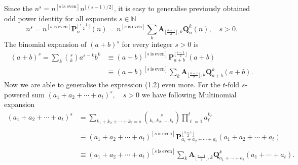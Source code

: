 \documentclass[12pt, letterpaper]{amsart}
\theoremstyle{definition}
\theoremstyle{remark}
\numberwithin{equation}{section}
\begin{document}
Since the $n^s = n^{[s \ \mathrm{is} \ \mathrm{even}]} n^{\lfloor (s-1)/2 \rfloor}$, it is easy to generalise previously obtained odd power identity for all exponents $s\in\mathbb{N}$
\begin{equation}
n^s
= n^{[s \ \mathrm{is} \ \mathrm{even}]} \mathbf{P}^{\lfloor \tfrac{s-1}{2} \rfloor}_{n}(n)
= n^{[s \ \mathrm{is} \ \mathrm{even}]}\sum_{k}^{ \ }\mathbf{A}_{\lfloor \tfrac{s-1}{2} \rfloor, k}\mathbf{Q}^{k}_{n}(n), \quad s>0.
\end{equation}
The binomial expansion of $(a+b)^s$ for every integer $s>0$ is
\begin{equation*}
\begin{split}
(a+b)^s=\sum_{k} \binom{s}{k} a^{s-k} b^k
&\equiv(a+b)^{[s \ \mathrm{is} \ \mathrm{even}]} \mathbf{P}^{\lfloor \tfrac{s-1}{2} \rfloor}_{a+b}(a+b) \\
&\equiv(a+b)^{[s \ \mathrm{is} \ \mathrm{even}]}\sum_{k}^{ \ }\mathbf{A}_{\lfloor \tfrac{s-1}{2} \rfloor, k}\mathbf{Q}^{k}_{a+b}(a+b).
\end{split}
\end{equation*}
Now we are able to generalise the expression (1.2) even more. For the $t$-fold $s$-powered sum $(a_1+a_2+\cdots+a_t)^s, \quad s>0$ we have following Multinomial expansion
\begin{equation*}
\begin{split}
(a_1+a_2+\cdots+a_t)^s 
&=\sum_{k_1+k_2+\cdots+k_t=s}\binom{s}{k_1, k_2,\ldots, k_t} \prod_{\ell=1}^{t}a_\ell^{k_\ell}\\
\\
&\equiv (a_1+a_2+\cdots+a_t)^{[s \ \mathrm{is} \ \mathrm{even}]} 
\mathbf{P}^{\lfloor \tfrac{s-1}{2} \rfloor}_{a_1+a_2+\cdots+a_t}(a_1+a_2+\cdots+a_t) \\
\\
&\equiv (a_1+a_2+\cdots+a_t)^{[s \ \mathrm{is} \ \mathrm{even}]} 
\sum_{k}^{ \ }\mathbf{A}_{\lfloor \tfrac{s-1}{2} \rfloor, k}\mathbf{Q}^{k}_{a_1+\cdots+a_t}(a_1+\cdots+a_t).
\end{split}
\end{equation*}
\end{document}
